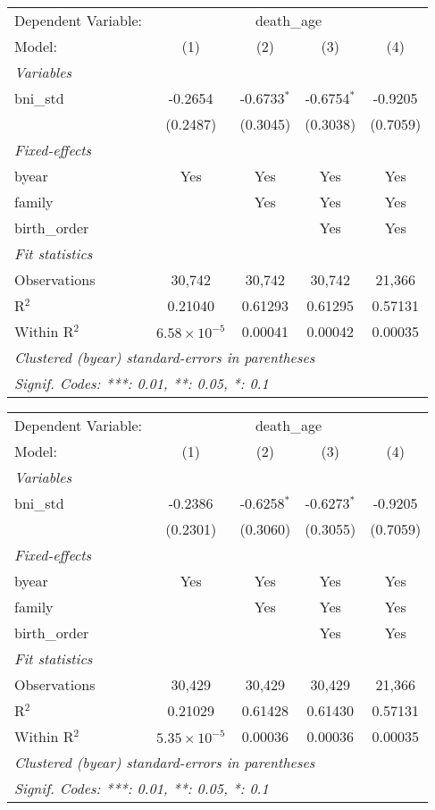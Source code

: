 \begin{tabular}{lcccc}
\tabularnewline\midrule\midrule
Dependent Variable: & \multicolumn{4}{c}{death\_age}\\
Model: & (1) & (2) & (3) & (4)\\
\midrule \emph{Variables} &   &   &   &  \\
bni\_std & -0.2654 & -0.6733$^{*}$ & -0.6754$^{*}$ & -0.9205\\
  & (0.2487) & (0.3045) & (0.3038) & (0.7059)\\
\midrule \emph{Fixed-effects} &   &   &   &  \\
byear & Yes & Yes & Yes & Yes\\
family &  & Yes & Yes & Yes\\
birth\_order &  &  & Yes & Yes\\
\midrule \emph{Fit statistics} &   &   &   &  \\
Observations & 30,742 & 30,742 & 30,742 & 21,366\\
R$^2$ & 0.21040 & 0.61293 & 0.61295 & 0.57131\\
Within R$^2$ & $6.58\times 10^{-5}$ & 0.00041 & 0.00042 & 0.00035\\
\midrule\midrule\multicolumn{5}{l}{\emph{Clustered (byear) standard-errors in parentheses}}\\
\multicolumn{5}{l}{\emph{Signif. Codes: ***: 0.01, **: 0.05, *: 0.1}}\\
\end{tabular}



\begin{tabular}{lcccc}
\tabularnewline\midrule\midrule
Dependent Variable: & \multicolumn{4}{c}{death\_age}\\
Model: & (1) & (2) & (3) & (4)\\
\midrule \emph{Variables} &   &   &   &  \\
bni\_std & -0.2386 & -0.6258$^{*}$ & -0.6273$^{*}$ & -0.9205\\
  & (0.2301) & (0.3060) & (0.3055) & (0.7059)\\
\midrule \emph{Fixed-effects} &   &   &   &  \\
byear & Yes & Yes & Yes & Yes\\
family &  & Yes & Yes & Yes\\
birth\_order &  &  & Yes & Yes\\
\midrule \emph{Fit statistics} &   &   &   &  \\
Observations & 30,429 & 30,429 & 30,429 & 21,366\\
R$^2$ & 0.21029 & 0.61428 & 0.61430 & 0.57131\\
Within R$^2$ & $5.35\times 10^{-5}$ & 0.00036 & 0.00036 & 0.00035\\
\midrule\midrule\multicolumn{5}{l}{\emph{Clustered (byear) standard-errors in parentheses}}\\
\multicolumn{5}{l}{\emph{Signif. Codes: ***: 0.01, **: 0.05, *: 0.1}}\\
\end{tabular}




